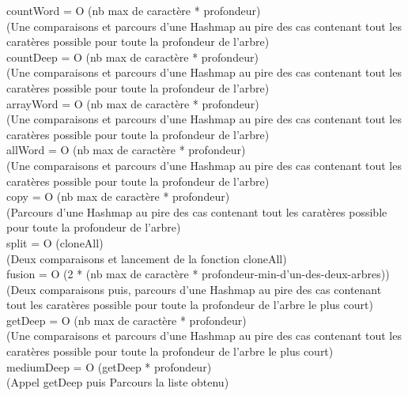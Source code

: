 \documentclass{article}
\begin{document}
countWord = O (nb max de caract\`ere * profondeur)\\
(Une comparaisons et parcours d'une Hashmap au pire des cas contenant tout
les carat\`eres possible pour toute la profondeur de l'arbre)\\

countDeep = O (nb max de caract\`ere * profondeur)\\
(Une comparaisons et parcours d'une Hashmap au pire des cas contenant tout
les carat\`eres possible pour toute la profondeur de l'arbre)\\

arrayWord = O (nb max de caract\`ere * profondeur)\\
(Une comparaisons et parcours d'une Hashmap au pire des cas contenant tout
les carat\`eres possible pour toute la profondeur de l'arbre)\\

allWord = O (nb max de caract\`ere * profondeur)\\
(Une comparaisons et parcours d'une Hashmap au pire des cas contenant tout
les carat\`eres possible pour toute la profondeur de l'arbre)\\

copy = O (nb max de caract\`ere * profondeur)\\
(Parcours d'une Hashmap au pire des cas contenant tout les carat\`eres
possible pour toute la profondeur de l'arbre)\\

split = O (cloneAll)\\
(Deux comparaisons et lancement de la fonction cloneAll)\\

fusion = O (2 * (nb max de caract\`ere * profondeur-min-d'un-des-deux-arbres))
\\
(Deux comparaisons puis, parcours d'une Hashmap au pire des cas contenant
tout les carat\`eres possible pour toute la profondeur de l'arbre le plus court)\\

getDeep = O (nb max de caract\`ere * profondeur)\\
(Une comparaisons et parcours d'une Hashmap au pire des cas contenant tout
les carat\`eres possible pour toute la profondeur de l'arbre le plus court)\\

mediumDeep = O (getDeep * profondeur)\\
(Appel getDeep puis Parcours la liste obtenu)\\
\end{document}
